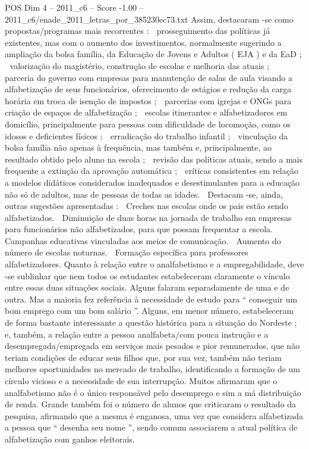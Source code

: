 \begin{textsample}{POS Dim 4 – 2011\_c6 – Score -1.00 – 2011\_c6/enade\_2011\_letras\_por\_385230ec73.txt}
Assim, destacaram -se como propostas/programas mais recorrentes :  prosseguimento das políticas já existentes, mas com o aumento dos investimentos, normalmente sugerindo a ampliação da bolsa família, da Educação de Jovens e Adultos ( EJA ) e da EaD ;  valorização do magistério, construção de escolas e melhoria das atuais ;  parceria do governo com empresas para manutenção de salas de aula visando a alfabetização de seus funcionários, oferecimento de estágios e redução da carga horária em troca de isenção de impostos ;  parcerias com igrejas e ONGs para criação de espaços de alfabetização ;  escolas itinerantes e alfabetizadores em domicílio, principalmente para pessoas com dificuldade de locomoção, como os idosos e deficientes físicos ;  erradicação do trabalho infantil ;  vinculação da bolsa família não apenas à frequência, mas também e, principalmente, ao resultado obtido pelo aluno na escola ;  revisão das políticas atuais, sendo a mais frequente a extinção da aprovação automática ;  críticas consistentes em relação a modelos didáticos considerados inadequados e desestimulantes para a educação não só de adultos, mas de pessoas de todas as idades.  Destacam -se, ainda, outras sugestões apresentadas :  Creches nas escolas onde os pais estão sendo alfabetizados.  Diminuição de duas horas na jornada de trabalho em empresas para funcionários não alfabetizados, para que possam frequentar a escola.  Campanhas educativas vinculadas aos meios de comunicação.  Aumento do número de escolas noturnas.  Formação específica para professores alfabetizadores.
Quanto à relação entre o analfabetismo e a empregabilidade, deve -se sublinhar que nem todos os estudantes estabeleceram claramente o vínculo entre essas duas situações sociais.
Alguns falaram separadamente de uma e de outra.
Mas a maioria fez referência à necessidade de estudo para “ conseguir um bom emprego com um bom salário ”.
Alguns, em menor número, estabeleceram de forma bastante interessante a questão histórica para a situação do Nordeste ; e, também, a relação entre a pessoa analfabeta/com pouca instrução e a desempregada/empregada em serviços mais pesados e pior remunerados, que não teriam condições de educar seus filhos que, por sua vez, também não teriam melhores oportunidades no mercado de trabalho, identificando a formação de um círculo vicioso e a necessidade de sua interrupção.
Muitos afirmaram que o analfabetismo não é o único responsável pelo desemprego e sim a má distribuição de renda.
Grande também foi o número de alunos que criticaram o resultado da pesquisa, afirmando que a mesma é enganosa, uma vez que considera alfabetizada a pessoa que “ desenha seu nome ”, sendo comum associarem a atual política de alfabetização com ganhos eleitorais.

\end{textsample}
